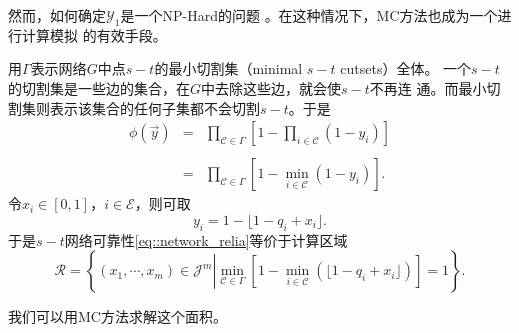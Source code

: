 然而，如何确定$\mathscr{Y}_1$是一个NP-Hard的问题
\cite{Provan1984Computing}。在这种情况下，MC方法也成为一个进行计算模拟
的有效手段。

用$\Gamma$表示网络$G$中点$s-t$的最小切割集（minimal $s-t$ cutsets）全体。
一个$s-t$的切割集是一些边的集合，在$G$中去除这些边，就会使$s-t$不再连
通。而最小切割集则表示该集合的任何子集都不会切割$s-t$。于是
$$
\begin{array}{rcl}
\displaystyle \phi(\vec{y}) &=& \displaystyle \prod_{\mathscr{C} \in
  \Gamma} \left[1 - \prod_{i \in \mathscr{C}}(1 - y_i)\right] \\\\ & =
& \displaystyle \prod_{\mathscr{C} \in \Gamma}\left[1 - \min_{i \in
    \mathscr{C}}(1 - y_i)\right].
\end{array}
$$
令$x_i \in [0, 1]$，$i \in \mathscr{E}$，则可取
$$
y_i = 1 - \lfloor 1 - q_i + x_i \rfloor.
$$
于是$s-t$网络可靠性\ref{eq::network_relia}等价于计算区域
$$
\mathscr{R} = \left\{(x_1, \cdots, x_m) \in \mathscr{J}^m
\left| \min_{\mathscr{C} \in \Gamma} \left[1
  - \min_{i \in \mathscr{C}}(\lfloor1 - q_i + x_i\rfloor)\right] = 1\right.\right\}.
$$

我们可以用MC方法求解这个面积。
